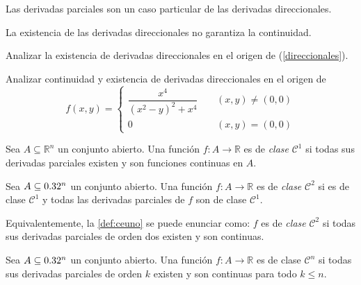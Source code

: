 \begin{obs}
    Las derivadas parciales son un caso particular de las derivadas direccionales.
\end{obs}

\begin{obs}
La existencia de las derivadas direccionales no garantiza la continuidad.
\end{obs}
  
\begin{tarea}
Analizar la existencia de derivadas direccionales en el origen de (\ref{direccionales}).
\end{tarea}


\begin{tarea}  Analizar continuidad y existencia de derivadas direccionales en el origen de
\begin{equation*}
f(x,y)=\left\{\begin{array}{cc} 
\dfrac{x^{4}}{ (x^2-y)^{2}+x^{4} } & \;\;\;\; (x,y) \neq (0,0) \\[1em]
0 & \;\;\;\; (x,y)=(0,0)
\end{array}\right.
\end{equation*}
\end{tarea}



\begin{definition}
    Sea $A \subseteq \mathbb{R}^n$ un conjunto abierto. Una función $f: A \to \mathbb{R}$ es de \emph{clase} $\mathcal{C}^1$ si todas sus derivadas parciales existen y son funciones continuas en $A$.
\end{definition}

\begin{definition}\label{def:ceuno}
    Sea $A\subseteq0.32^n$ un conjunto abierto. Una función $f: A \to \mathbb{R}$ es de \emph{clase} $\mathcal{C}^2$ si es de clase $\mathcal{C}^1$ y todas las derivadas parciales de $f$ son de clase $\mathcal{C}^1$.
\end{definition}

\begin{obs}
    Equivalentemente, la \autoref{def:ceuno} se puede enunciar como: $f$ es de \emph{clase} $\mathcal{C}^2$ si todas sus derivadas parciales de orden dos existen y son continuas.
\end{obs}


\begin{definition}
    Sea $A\subseteq0.32^n$ un conjunto abierto. Una función $f: A \to \mathbb{R}$ es de clase $\mathcal{C}^n$ si todas sus derivadas parciales de orden $k$ existen y son continuas para todo $k \leq n$.
\end{definition}

